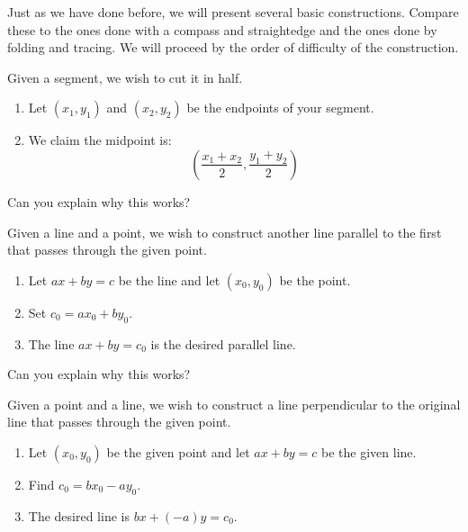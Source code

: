 Just as we have done before, we will present several basic
constructions. Compare these to the ones done with a compass and
straightedge and the ones done by folding and tracing. We will proceed
by the order of difficulty of the construction.


\begin{construction} 
Given a segment, we wish to cut it in half.
\begin{enumerate}
\item Let $(x_1,y_1)$ and $(x_2,y_2)$ be the endpoints of your segment.
\item We claim the midpoint is:
\[
\left(\frac{x_1+x_2}{2},\frac{y_1+y_2}{2} \right)
\]
\end{enumerate}
\end{construction}

\begin{question} Can you explain why this works?
\end{question}
\QM



\begin{construction} 
 Given a line and a point, we wish to construct another line parallel
 to the first that passes through the given point.
\begin{enumerate}
\item Let $ax + by = c$ be the line and let $(x_0,y_0)$ be the point.
\item Set $c_0 = ax_0 + by_0$.
\item The line $ax + by= c_0$ is the desired parallel line.
\end{enumerate}
\end{construction}

\begin{question} Can you explain why this works?
\end{question}
\QM


\begin{construction}  
Given a point and a line, we wish to construct a line perpendicular to
the original line that passes through the given point.
\begin{enumerate}
\item Let $(x_0,y_0)$ be the given point and let $ax + by = c$ be the
  given line.
\item Find $c_0 = bx_0 - ay_0$.
\item The desired line is $bx + (-a)y = c_0$.
\end{enumerate}
\end{construction}

